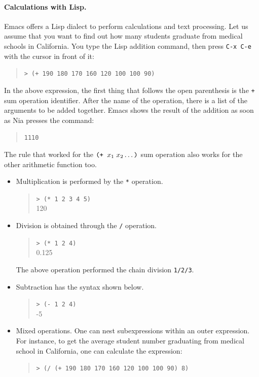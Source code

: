 \documentclass[a4paper,12pt]{book}
\begin{document}
\paragraph{Calculations with Lisp.} Emacs
offers a Lisp dialect to perform calculations
and text processing. Let us assume that you
want to find out how many students graduate from
medical schools in California. You type the Lisp
addition command, then press \verb|C-x C-e| with
the cursor in front of it:
\begin{quote}
	\verb|> (+ 190 180 170 160 120 100 100 90)|
\end{quote}
In the above expression, the first thing that follows
the open parenthesis is the \verb|+| sum
operation identifier. After the name of
the operation, there is a list of
the arguments to be added together.
Emacs shows the result of the addition as soon as
Nia presses the  command:
\begin{quote}
	\verb|1110|
\end{quote}
The rule that worked for  the $\verb|(+ | x_1\;x_2\ldots\verb|)|$
sum operation also works for the  other arithmetic function too.
\begin{itemize}
	\item{Multiplication} is performed
		by the \verb|*| operation.
		\begin{quote}
			\verb|> (* 1 2 3 4 5)|\\
			120
		\end{quote}
	\item{Division} is obtained through the \verb|/| operation.
		\begin{quote}
			\verb|> (* 1 2 4)|\\
			0.125
		\end{quote}
		The above operation performed the chain
		division \verb|1/2/3|.
	\item{Subtraction} has the syntax shown below.
		\begin{quote}
			\verb|> (- 1 2 4)|\\
			-5
		\end{quote}
	\item Mixed operations. One can nest subexpressions
		within an outer expression. For instance,
		to get the average student number graduating
		from medical school in California, one can
		calculate the expression:
		\begin{quote}
			\verb|> (/ (+ 190 180 170 160 120 100 100 90) 8)|
		\end{quote}

\end{itemize}
\end{document}
